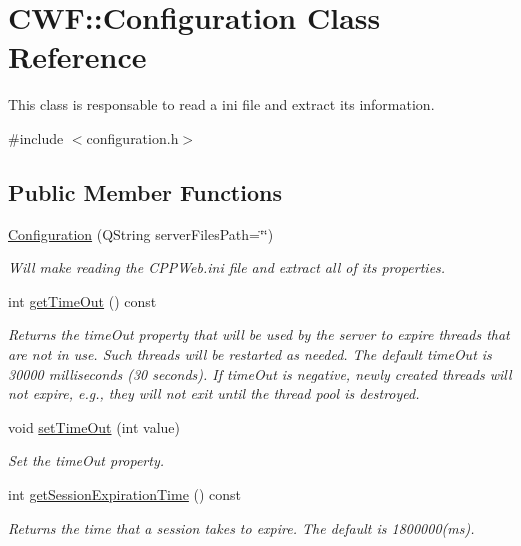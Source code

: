 \hypertarget{class_c_w_f_1_1_configuration}{\section{C\+W\+F\+:\+:Configuration Class Reference}
\label{class_c_w_f_1_1_configuration}
}


This class is responsable to read a ini file and extract its information.  




{\ttfamily \#include $<$configuration.\+h$>$}

\subsection*{Public Member Functions}
\begin{DoxyCompactItemize}
\item 
\hyperlink{class_c_w_f_1_1_configuration_ac0436a9c09fe7fee4f01b8409b91c256}{Configuration} (Q\+String server\+Files\+Path=\char`\"{}\char`\"{})
\begin{DoxyCompactList}\small\item\em Will make reading the C\+P\+P\+Web.\+ini file and extract all of its properties. \end{DoxyCompactList}\item 
int \hyperlink{class_c_w_f_1_1_configuration_a225665a95e1c2f9a5057466971c81156}{get\+Time\+Out} () const 
\begin{DoxyCompactList}\small\item\em Returns the time\+Out property that will be used by the server to expire threads that are not in use. Such threads will be restarted as needed. The default time\+Out is 30000 milliseconds (30 seconds). If time\+Out is negative, newly created threads will not expire, e.\+g., they will not exit until the thread pool is destroyed. \end{DoxyCompactList}\item 
void \hyperlink{class_c_w_f_1_1_configuration_a5418aa4515604ff80a644767f7897432}{set\+Time\+Out} (int value)
\begin{DoxyCompactList}\small\item\em Set the time\+Out property. \end{DoxyCompactList}\item 
int \hyperlink{class_c_w_f_1_1_configuration_a6d552d15e21329b9e042a659abdf1350}{get\+Session\+Expiration\+Time} () const 
\begin{DoxyCompactList}\small\item\em Returns the time that a session takes to expire. The default is 1800000(ms). \end{DoxyCompactList}\item 

\end{DoxyCompactItemize}
